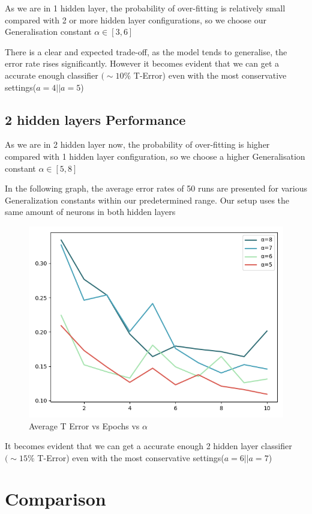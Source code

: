 \documentclass{proc}
\begin{document}
	As we are in 1 hidden layer, the probability of over-fitting is relatively small compared with 2 or more hidden layer configurations, so we choose our Generalisation constant $\alpha \in [3,6]$
	
	There is a clear and expected trade-off, as the model tends to generalise, the error rate rises significantly.
	However it becomes evident that we can get a accurate enough classifier $(\sim 10\% $ T-Error) even with the most conservative settings(${a=4  || a=5}$)
	\subsection{2 hidden layers Performance}
	As we are in 2 hidden layer now, the probability of over-fitting is higher compared with 1 hidden layer configuration, so we choose a higher Generalisation constant  $\alpha \in [5,8]$
	
	In the following graph, the average error rates of 50 runs are presented for various Generalization constants within our predetermined range. Our setup uses the same amount of neurons in both hidden layers
	
	\begin{figure}[!h]
		\includegraphics[width=\linewidth]{gentwo.png}
		\caption{Average T Error vs Epochs vs $\alpha$}
		\label{fig:1-X-1}
	\end{figure}
	
	It becomes evident that we can get a accurate enough 2 hidden layer classifier $(\sim 15\% $ T-Error) even with the most conservative settings(${a=6  || a=7}$)
	

	\section{Comparison}
	
\end{document}
